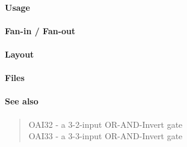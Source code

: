 \paragraph{Usage}

\paragraph{Fan-in / Fan-out}

\paragraph{Layout}

\paragraph{Files}

\paragraph{See also}
\begin{quote}
    OAI32 - a 3-2-input OR-AND-Invert gate \\
    OAI33 - a 3-3-input OR-AND-Invert gate
\end{quote}
